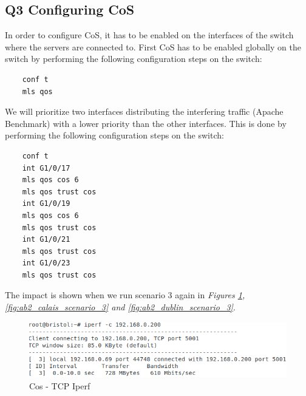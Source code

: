 \documentclass{article}
\begin{document}
\subsection{Q3 Configuring CoS}
In order to configure CoS, it has to be enabled on the interfaces of the switch where the servers are connected to. First CoS has to be enabled globally on the switch by performing the following configuration steps on the switch:
\begin{verbatim}
    conf t
    mls qos
\end{verbatim}

We will prioritize two interfaces distributing the interfering traffic (Apache Benchmark) with a lower priority than the other interfaces. This is done by performing the following configuration steps on the switch:
\begin{verbatim}
    conf t
    int G1/0/17
    mls qos cos 6
    mls qos trust cos
    int G1/0/19
    mls qos cos 6
    mls qos trust cos
    int G1/0/21
    mls qos trust cos
    int G1/0/23
    mls qos trust cos
\end{verbatim}

The impact is shown when we run scenario 3 again in \textit{Figures \ref{fig:throughput_scenario_3}, \ref{fig:ab2_calais_scenario_3} and \ref{fig:ab2_dublin_scenario_3}}.

\begin{figure}[H]
\includegraphics[width=14cm]{figures/q3-1-1.png}
\centering
\caption{Cos - TCP Iperf}
\centering
\label{fig:throughput_scenario_3}
\end{figure}
\end{document}
